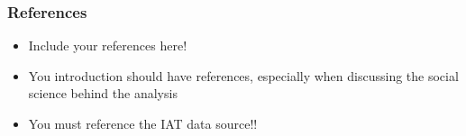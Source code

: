 \documentclass[
  letterpaper,
  DIV=11,
  numbers=noendperiod]{scrartcl}
\providecommand{\tightlist}{%
  \setlength{\itemsep}{0pt}\setlength{\parskip}{0pt}}\usepackage{longtable,booktabs,array}
\begin{document}
\subsubsection{References}\label{references}

\begin{itemize}
\tightlist
\item
  Include your references here!
\item
  You introduction should have references, especially when discussing
  the social science behind the analysis
\item
  You must reference the IAT data source!!
\end{itemize}
\end{document}
